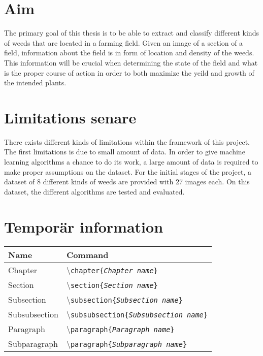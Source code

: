 \section{Aim}

The primary goal of this thesis is to be able to extract and classify different kinds of weeds that are located in a farming field. Given an image of a section of a field, information about the field is in form of location and density of the weeds. This information will be crucial when determining the state of the field and what is the proper course of action in order to both maximize the yeild and growth of the intended plants.





\section{Limitations \textbf{senare}}

There exists different kinds of limitations within the framework of this project. The first limitations is due to small amount of data. In order to give machine learning algorithms a chance to do its work, a large amount of data is required to make proper assumptions on the dataset. For the initial stages of the project, a dataset of 8 different kinds of weeds are provided with 27 images each. On this dataset, the different algorithms are tested and evaluated.

\section{Temporär information}

\begin{table}[H]
\centering
\begin{tabular}{ll} \hline\hline
Name & Command\\ \hline
Chapter & \textbackslash\texttt{chapter\{\emph{Chapter name}\}}\\
Section & \textbackslash\texttt{section\{\emph{Section name}\}}\\
Subsection & \textbackslash\texttt{subsection\{\emph{Subsection name}\}}\\
Subsubsection & \textbackslash\texttt{subsubsection\{\emph{Subsubsection name}\}}\\
Paragraph & \textbackslash\texttt{paragraph\{\emph{Paragraph name}\}}\\
Subparagraph & \textbackslash\texttt{paragraph\{\emph{Subparagraph name}\}}\\ \hline\hline
\end{tabular}
\end{table}
